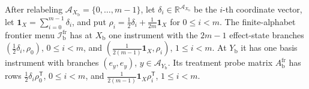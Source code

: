 After relabeling \(\mathcal A_{X_{\mathrm b}}=\{0,\ldots,m-1\}\), let \(\delta_i\in\mathbb R^{\mathcal A_{X_{\mathrm b}}}\) be the \(i\)-th coordinate vector, let \(\mathbf 1_X=\sum_{i=0}^{m-1}\delta_i\), and put \(\rho_i=\tfrac12\delta_i+\tfrac1{2m}\mathbf 1_X\) for \(0\le i<m\).  The finite-alphabet frontier menu \(\mathcal I_{\mathrm b}^{\mathrm{fr}}\) has at \(X_{\mathrm b}\) one instrument with the \(2m-1\) effect-state branches \((\tfrac12\delta_i,\rho_0)\), \(0\le i<m\), and \((\tfrac1{2(m-1)}\mathbf 1_X,\rho_i)\), \(1\le i<m\).  At \(Y_{\mathrm b}\) it has one basis instrument with branches \((e_y,e_y)\), \(y\in\mathcal A_{Y_{\mathrm b}}\).  Its treatment probe matrix \(A_{\mathrm b}^{\mathrm{fr}}\) has rows \(\tfrac12\delta_i\rho_0^{\mathsf T}\), \(0\le i<m\), and \(\tfrac1{2(m-1)}\mathbf 1_X\rho_i^{\mathsf T}\), \(1\le i<m\).